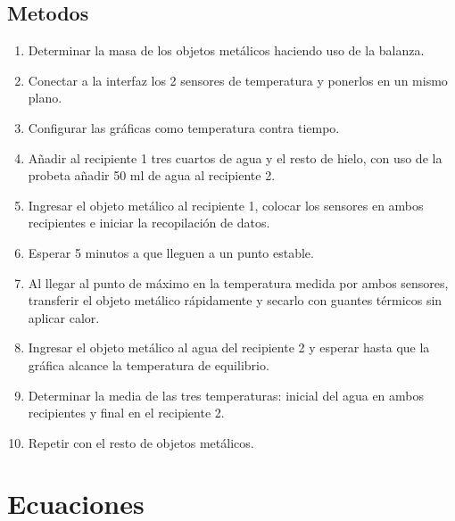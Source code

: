 \documentclass[12pt,a4paper]{config/myConfig}
\begin{document}
\subsection{Metodos}
\label{sec:METODOS}
\begin{enumerate}
    \item Determinar la masa de los objetos metálicos haciendo uso de la balanza.
    \item Conectar a la interfaz los 2 sensores de temperatura y ponerlos en un mismo plano.
    \item Configurar las gráficas como temperatura contra tiempo.
    \item Añadir al recipiente 1 tres cuartos de agua y el resto de hielo, con uso de la probeta añadir 50 ml de agua al recipiente 2.
    \item Ingresar el objeto metálico al recipiente 1, colocar los sensores en ambos recipientes e iniciar la recopilación de datos.
    \item Esperar 5 minutos a que lleguen a un punto estable.
    \item Al llegar al punto de máximo en la temperatura medida por ambos sensores, transferir el objeto metálico rápidamente y secarlo con guantes térmicos sin aplicar calor.
    \item Ingresar el objeto metálico al agua del recipiente 2 y esperar hasta que la gráfica alcance la temperatura de equilibrio.
    \item Determinar la media de las tres temperaturas: inicial del agua en ambos recipientes y final en el recipiente 2.
    \item Repetir con el resto de objetos metálicos.
\end{enumerate}

\section{Ecuaciones}
\label{sec:ECUACIONES}
\end{document}
